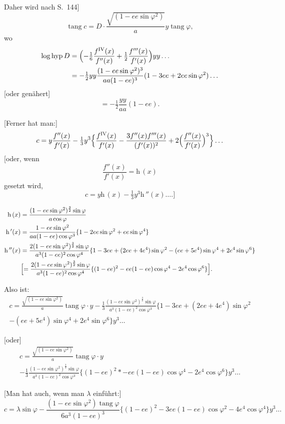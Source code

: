 \documentclass[12pt,a4paper]{article}
\newcommand{\tang}{\operatorname{tang}}
\newcommand{\loghyp}{\operatorname{log\,hyp}}
\begin{document}
Daher wird nach S.~144]
\[
\tang c = D\cdot\frac{\sqrt{(1-ee\sin\varphi^2)}}{a}y\tang\varphi,
\]
wo
\begin{align*}
\loghyp D &= \Bigl(-\tfrac{1}{6}\frac{f^{\mathrm{IV}}(x)}{f''(x)} + \tfrac{1}{2}\frac{f'''(x)}{f'(x)}\Bigr)yy\ldots\\
&= -\tfrac{1}{2}yy\frac{(1-ee\sin\varphi^2)^3}{aa(1-ee)^3}(1-3ee+2ee\sin\varphi^2)\ldots
\end{align*}
[oder genähert]
\[
= -\tfrac{1}{2}\frac{yy}{aa}(1-ee).
\]

[Ferner hat man:]
\[
c = y\frac{f''(x)}{f'(x)} - \tfrac{1}{3}y^3\Bigl\{\frac{f^{\mathrm{IV}}(x)}{f'(x)} - \frac{3f''(x)f'''(x)}{(f'(x))^2} + 2\Bigl(\frac{f''(x)}{f'(x)}\Bigr)^3\Bigr\}\ldots
\]
[oder, wenn
\[
\frac{f''(x)}{f'(x)} = \mathrm{h}\,(x)
\]
gesetzt wird,
\[
c = y\mathrm{h}\,(x) - \tfrac{1}{3}y^3\mathrm{h}\,''(x)\ldots.\Bigr]
\]

\begin{align*}
\mathrm{h}\,(x) &= \frac{(1-ee\sin\varphi^2)^{\frac{3}{2}}\sin\varphi}{a\cos\varphi}\\
\mathrm{h}\,'(x) &= \frac{1-ee\sin\varphi^2}{aa(1-ee)\cos\varphi^3}\{1-2ee\sin\varphi^2+ee\sin\varphi^4\}\\
\mathrm{h}\,''(x) &= \frac{2(1-ee\sin\varphi^2)^{\frac{3}{2}}\sin\varphi}{a^3(1-ee)^2\cos\varphi^4}\{1-3ee+(2ee+4e^4)\sin\varphi^2-(ee+5e^4)\sin\varphi^4+2e^4\sin\varphi^6\}\\
&\Bigl[= \frac{2(1-ee\sin\varphi^2)^{\frac{3}{2}}\sin\varphi}{a^3(1-ee)^2\cos\varphi^4}\{(1-ee)^2-ee(1-ee)\cos\varphi^4-2e^4\cos\varphi^6\}\Bigr].
\end{align*}

Also ist:
\begin{multline*}
c = \frac{\sqrt{(1-ee\sin\varphi^2)}}{a}\tang\varphi\cdot y - \tfrac{1}{3}\frac{(1-ee\sin\varphi^2)^{\frac{3}{2}}\sin\varphi}{a^3(1-ee)^2\cos\varphi^3}\{1-3ee+(2ee+4e^4)\sin\varphi^2\\
-(ee+5e^4)\sin\varphi^4+2e^4\sin\varphi^6\}y^3\ldots
\end{multline*}

[oder]
\begin{multline*}
c = \frac{\sqrt{(1-ee\sin\varphi^2)}}{a}\tang\varphi\cdot y\\
- \tfrac{1}{3}\frac{(1-ee\sin\varphi^2)^{\frac{3}{2}}\sin\varphi}{a^3(1-ee)^2\cos\varphi^3}\{(1-ee)^2*-ee(1-ee)\cos\varphi^4-2e^4\cos\varphi^6\}y^3\ldots
\end{multline*}

[Man hat auch, wenn man $\lambda$ einführt:]
\[
c = \lambda\sin\varphi - \frac{(1-ee\sin\varphi^2)\tang\varphi}{6a^3(1-ee)^3}\{(1-ee)^2-3ee(1-ee)\cos\varphi^2-4e^4\cos\varphi^4\}y^3\ldots
\]
\end{document}
